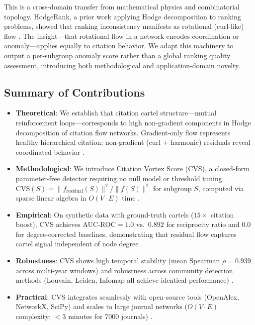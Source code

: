 \documentclass[11pt,letterpaper]{article}
\begin{document}
This is a cross-domain transfer from mathematical physics and combinatorial topology. HodgeRank, a prior work applying Hodge decomposition to ranking problems, showed that ranking inconsistency manifests as rotational (curl-like) flow \citep{Jiang2011}. The insight---that rotational flow in a network encodes coordination or anomaly---applies equally to citation behavior. We adapt this machinery to output a per-subgroup anomaly score rather than a global ranking quality assessment, introducing both methodological and application-domain novelty.

\subsection*{Summary of Contributions}

\begin{itemize}
  \item \textbf{Theoretical}: We establish that citation cartel structure---mutual reinforcement loops---corresponds to high non-gradient components in Hodge decomposition of citation flow networks. Gradient-only flow represents healthy hierarchical citation; non-gradient (curl + harmonic) residuals reveal coordinated behavior \citep{Frantzen2025}.

  \item \textbf{Methodological}: We introduce Citation Vortex Score (CVS), a closed-form parameter-free detector requiring no null model or threshold tuning. $\mathrm{CVS}(S) = \|f_{\mathrm{residual}}(S)\|^2 / \|f(S)\|^2$ for subgroup $S$, computed via sparse linear algebra in $O(V \cdot E)$ time \citep{Priem2022}.

  \item \textbf{Empirical}: On synthetic data with ground-truth cartels ($15\times$ citation boost), CVS achieves AUC-ROC$=1.0$ vs.\ $0.892$ for reciprocity ratio and $0.0$ for degree-corrected baselines, demonstrating that residual flow captures cartel signal independent of node degree \citep{Priem2022, Newman2003}.

  \item \textbf{Robustness}: CVS shows high temporal stability (mean Spearman $\rho=0.939$ across multi-year windows) and robustness across community detection methods (Louvain, Leiden, Infomap all achieve identical performance) \citep{Priem2022, Newman2003}.

  \item \textbf{Practical}: CVS integrates seamlessly with open-source tools (OpenAlex, NetworkX, SciPy) and scales to large journal networks ($O(V \cdot E)$ complexity; $<$3 minutes for 7000 journals) \citep{Priem2022}.
\end{itemize}
\end{document}
